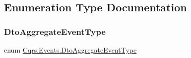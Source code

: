 \subsection{Enumeration Type Documentation}
\mbox{\label{namespaceCqrs_1_1Events_a2a32e13adeac92f5a93966cd8ee2d39a_a2a32e13adeac92f5a93966cd8ee2d39a}} 
\subsubsection{\texorpdfstring{Dto\+Aggregate\+Event\+Type}{DtoAggregateEventType}}
{\footnotesize\ttfamily enum \hyperlink{namespaceCqrs_1_1Events_a2a32e13adeac92f5a93966cd8ee2d39a_a2a32e13adeac92f5a93966cd8ee2d39a}{Cqrs.\+Events.\+Dto\+Aggregate\+Event\+Type}\hspace{0.3cm}{\ttfamily [strong]}}

